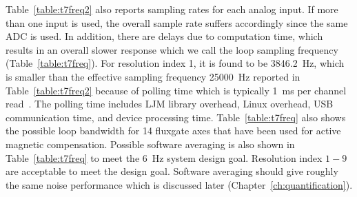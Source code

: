 
Table~\ref{table:t7freq2} also reports sampling rates for each analog input. If more than one input is used, the overall sample rate suffers accordingly since the same ADC is used. In addition, there are delays due to computation time, which results in an overall slower response which we call the loop sampling frequency (Table~\ref{table:t7freq}). For resolution index 1, it is found to be 3846.2~Hz, which is smaller than the effective sampling frequency 25000~Hz reported in Table~\ref{table:t7freq2} because of polling time which is typically 1~ms per channel read~\cite{T7}. The polling time includes LJM library overhead, Linux overhead, USB communication time, and device processing time. Table~\ref{table:t7freq} also shows the possible loop bandwidth for 14 fluxgate axes that have been used for active magnetic compensation. Possible software averaging is also shown in Table~\ref{table:t7freq} to meet the 6~Hz system design goal. Resolution index $1-9$ are acceptable to meet the design goal. Software averaging should give roughly the same noise performance which is discussed later (Chapter~\ref{ch:quantification}).


